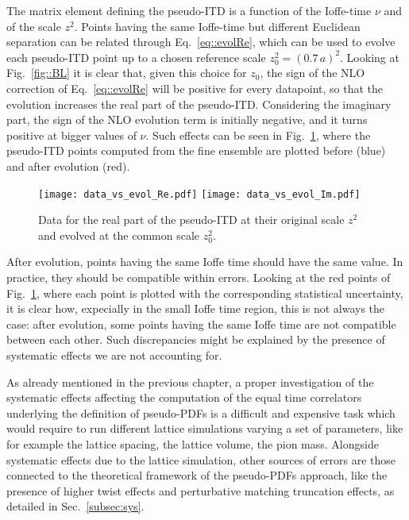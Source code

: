 The matrix element defining the pseudo-ITD is a function of the Ioffe-time $\nu$ and of the scale $z^2$.
Points having the same Ioffe-time but different Euclidean separation can be related through Eq.~\eqref{eq::evolRe}, 
which can be used to evolve each pseudo-ITD point up to a chosen reference scale $z_0 ^2 = \left(0.7\,a\right)^2$.
Looking at Fig.~\ref{fig::BL} it is clear that, given this choice for $z_0$, the sign of the NLO correction 
of Eq.~\eqref{eq::evolRe} will be positive for every datapoint, so that the evolution increases the real part of the pseudo-ITD.
Considering the imaginary part, the sign of the NLO evolution term is initially negative, and it turns positive at bigger values of $\nu$.
Such effects can be seen in Fig.~\ref{fig::evol}, where the pseudo-ITD points computed from the fine ensemble are plotted
before (blue) and after evolution (red). 
\begin{figure}[h!]
    \center
    \texttt{[image: data\_vs\_evol\_Re.pdf]}
    \texttt{[image: data\_vs\_evol\_Im.pdf]}
    \caption{Data for the real part of the pseudo-ITD at their original scale $z^2$ and evolved at the common scale $z_0^2$.}
    \label{fig::evol}
\end{figure}
After evolution, points having the same Ioffe time should have the same value.
In practice, they should be compatible within errors.
Looking at the red points of Fig.~\ref{fig::evol}, where each point is plotted with the corresponding statistical uncertainty, 
it is clear how, expecially in the small Ioffe time region, this is not always the case:
after evolution, some points having the same Ioffe time are not compatible between each other.
Such discrepancies might be explained by the presence of systematic effects we are not accounting for.

% 
As already mentioned in the previous chapter, a proper investigation of the systematic effects affecting
the computation of the equal time correlators underlying
the definition of pseudo-PDFs is a difficult and expensive task which would require to run different lattice simulations 
varying a set of parameters, like for example the lattice spacing, the lattice volume, the pion mass. 
Alongside systematic effects due to the lattice simulation, other sources of errors are those connected 
to the theoretical framework of the pseudo-PDFs approach, like the presence of higher twist effects 
and perturbative matching truncation effects, as detailed in Sec.~\ref{subsec:sys}. 
 
